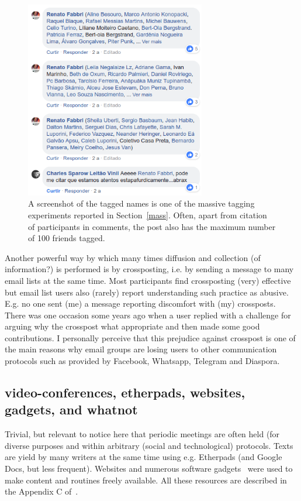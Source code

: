 \documentclass[a4paper]{article}
\begin{document}
\begin{figure}[H]
  \centering
    \includegraphics[width=0.7\textwidth]{Screenshot}
  \caption{A screenshot of the tagged names is one of the massive tagging experiments reported in Section~\ref{mass}. Often, apart from citation of participants in comments, the post also has the maximum number of 100 friends tagged.}\label{massive}
\end{figure}

Another powerful way by which many times diffusion and collection (of information?) is performed
is by crossposting, i.e. by sending a message to many email lists
at the same time.
Most participants find crossposting (very) effective but email list users also (rarely) report understanding such practice as abusive.
E.g. no one sent (me) a message reporting discomfort with (my) crossposts.
There was one occasion some years ago when a user replied with a challenge for
arguing why the crosspost what appropriate and then made some good contributions.
I personally perceive that this prejudice against crosspost is one of the main reasons
why email groups are losing users to other communication protocols such as provided by
Facebook, Whatsapp, Telegram and Diaspora.

\subsection{video-conferences, etherpads, websites, gadgets, and whatnot}\label{video}
Trivial, but relevant to notice here that periodic meetings are often held
(for diverse purposes and within arbitrary (social and technological) protocols.
Texts are yield by many writers at the same time using e.g. Etherpads (and Google Docs, but less frequent).
Websites and numerous software gadgets~\cite{ttmRepos} were used to make content and routines
freely available. All these resources are described in the Appendix C of~\cite{thesis}.
      
\end{document}
